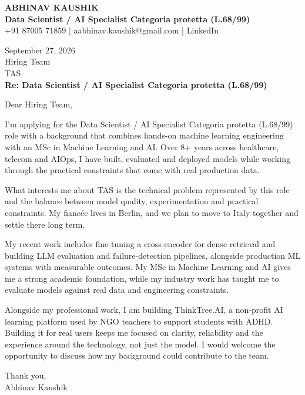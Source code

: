 \documentclass[10pt,a4paper]{article}
\begin{document}
\begin{center}
{\Large\bfseries ABHINAV KAUSHIK}\\[2pt]
{\bfseries Data Scientist / AI Specialist Categoria protetta (L.68/99)}\\[2pt]
+91 87005 71859 \quad | \quad aabhinav.kaushik@gmail.com \quad | \quad LinkedIn
\end{center}
\vspace{8pt}
September 27, 2026\\[6pt]
Hiring Team\\
TAS\\[4pt]
\textbf{Re: Data Scientist / AI Specialist Categoria protetta (L.68/99)}

Dear Hiring Team,

I’m applying for the Data Scientist / AI Specialist Categoria protetta (L.68/99) role with a background that combines hands-on machine learning engineering with an MSc in Machine Learning and AI. Over 8+ years across healthcare, telecom and AIOps, I have built, evaluated and deployed models while working through the practical constraints that come with real production data.

What interests me about TAS is the technical problem represented by this role and the balance between model quality, experimentation and practical constraints. My fiancée lives in Berlin, and we plan to move to Italy together and settle there long term.

My recent work includes fine-tuning a cross-encoder for dense retrieval and building LLM evaluation and failure-detection pipelines, alongside production ML systems with measurable outcomes. My MSc in Machine Learning and AI gives me a strong academic foundation, while my industry work has taught me to evaluate models against real data and engineering constraints.

Alongside my professional work, I am building ThinkTree.AI, a non-profit AI learning platform used by NGO teachers to support students with ADHD. Building it for real users keeps me focused on clarity, reliability and the experience around the technology, not just the model. I would welcome the opportunity to discuss how my background could contribute to the team.

Thank you,\\
Abhinav Kaushik
\end{document}
